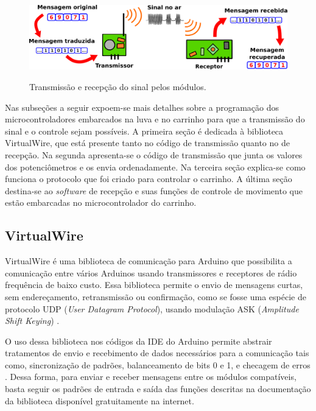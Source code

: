 \documentclass[
	12pt,				%
	openright,			%
	oneside,			%
	a4paper,			%
	english,			%
	brazil				%
	]{abntex2}
\begin{document}
		\begin{figure}[h!]
			\centering
			\caption{Transmissão e recepção do sinal pelos módulos.}
  		\includegraphics[width=14cm]{./figures/tx-rx-scheme1.png}
  		\label{Fig:tx-rx-scheme1}
		\end{figure}

		Nas subseções a seguir expoem-se mais detalhes sobre a programação dos microcontroladores embarcados na luva e no carrinho para que a transmissão do sinal e o controle sejam possíveis. A primeira seção é dedicada à biblioteca VirtualWire, que está presente tanto no código de transmissão quanto no de recepção. Na segunda apresenta-se o código de transmissão que junta os valores dos potenciômetros e os envia ordenadamente. Na terceira seção explica-se como funciona o protocolo que foi criado para controlar o carrinho. A última seção destina-se ao \textit{software} de recepção e suas funções de controle de movimento que estão embarcadas no microcontrolador do carrinho.


		\subsection{VirtualWire}


		VirtualWire é uma biblioteca de comunicação para Arduino que possibilita a comunicação entre vários Arduinos usando transmissores e receptores de rádio frequência de baixo custo. Essa biblioteca permite o envio de mensagens curtas, sem endereçamento, retransmissão ou confirmação, como se fosse uma espécie de protocolo UDP (\textit{User Datagram Protocol}), usando modulação ASK (\textit{Amplitude Shift Keying}) \cite{virtualwiremanual}. 

		O uso dessa biblioteca nos códigos da IDE do Arduino permite abstrair tratamentos de envio e recebimento de dados necessários para a comunicação tais como, sincronização de padrões, balanceamento de bits 0 e 1, e checagem de erros \cite{virtualwirepjrc}. Dessa forma, para enviar e receber mensagens entre os módulos compatíveis, basta seguir os padrões de entrada e saída das funções descritas na documentação da biblioteca disponível gratuitamente na internet.
\end{document}
